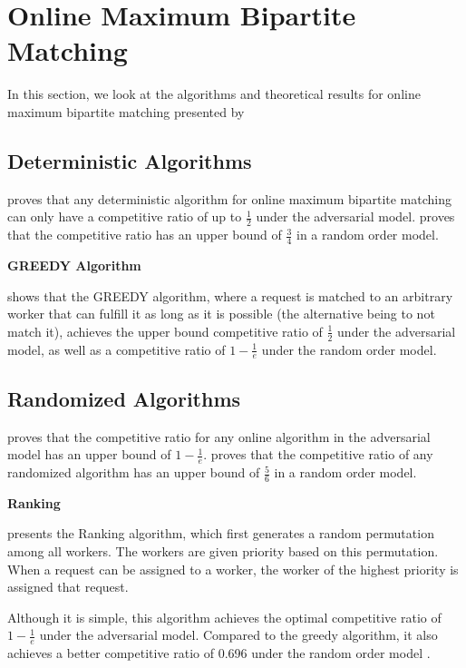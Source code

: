 \documentclass[urop]{socreport}
\begin{document}
\section{Online Maximum Bipartite Matching}
In this section, we look at the algorithms and theoretical results for online maximum bipartite matching presented by \cite{karp,goel}
\subsection{Deterministic Algorithms}
\cite{karp} proves that any deterministic algorithm for online maximum bipartite matching can only have a competitive ratio of up to $\frac{1}{2}$ under the adversarial model. \cite{goel} proves that the competitive ratio has an upper bound of $\frac{3}{4}$ in a random order model.

\vspace{2mm} \noindent \textbf{GREEDY Algorithm}

\noindent \cite{karp} shows that the GREEDY algorithm, where a request is matched to an arbitrary worker that can fulfill it as long as it is possible (the alternative being to not match it), achieves the upper bound competitive ratio of $\frac{1}{2}$ under the adversarial model, as well as a competitive ratio of $1 - \frac{1}{e}$ under the random order model.

\subsection{Randomized Algorithms}
\cite{karp} proves that the competitive ratio for any online algorithm in the adversarial model has an upper bound of $1 - \frac{1}{e}$.
\cite{goel} proves that the competitive ratio of any randomized algorithm has an upper bound of $\frac{5}{6}$ in a random order model.

\vspace{2mm} \noindent \textbf{Ranking}

\label{ranking}
\noindent \cite{karp} presents the Ranking algorithm, which first generates a random permutation among all workers. The workers are given priority based on this permutation. When a request can be assigned to a worker, the worker of the highest priority is assigned that request.

Although it is simple, this algorithm achieves the optimal competitive ratio of $1 - \frac{1}{e}$ under the adversarial model. Compared to the greedy algorithm, it also achieves a better competitive ratio of 0.696 under the random order model \cite{rankingrandomorder}.
\end{document}
